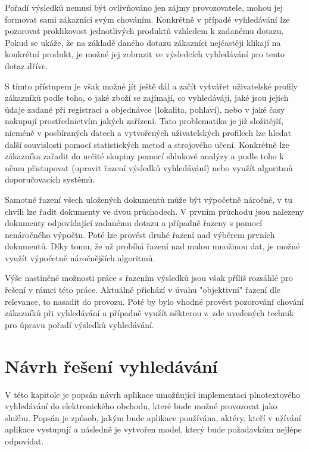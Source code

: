 \documentclass[FM,DP]{tulthesis}
\begin{document}
Pořadí výsledků nemusí být ovlivňováno jen zájmy provozovatele, mohou jej formovat
sami zákazníci svým chováním. Konkrétně v případě vyhledávání lze pozorovat proklikovost
jednotlivých produktů vzhledem k zadanému dotazu. Pokud se ukáže, že na základě
daného dotazu zákazníci nejčastěji klikají na konkrétní produkt, je možné jej zobrazit 
ve výsledcích vyhledávání pro tento dotaz dříve. 

S tímto přístupem je však možné jít ještě dál a začít vytvářet uživatelské profily zákazníků podle toho, 
o jaké zboží se zajímají, co vyhledávájí, jaké jsou jejich údaje zadané při registraci a objednávce 
(lokalita, pohlaví), nebo v jaké časy nakupují prostřednictvím jakých zařízení. Tato problematika je již
složitější, nicméně v posbíraných datech a vytvořených uživatelských profilech lze hledat další 
souvislosti pomocí statistických metod a strojového učení. Konkrétně lze zákazníka zařadit do určité 
skupiny pomocí shlukové analýzy a podle toho k němu přistupovat (upravit řazení výsledků vyhledávání) 
nebo využít algoritmů doporučovacích systémů.

Samotné řazení všech uložených dokumentů může být výpočetně náročné, v tu chvíli lze řadit
dokumenty ve dvou průchodech. V prvním průchodu jsou nalezeny dokumenty odpovídající zadanému 
dotazu a případně řazeny s pomocí nenáročného výpočtu. Poté lze provést druhé řazení nad výběrem 
prvních dokumentů. Díky tomu, že už probíhá řazení nad malou množinou dat, je možné využít 
výpočetně náročnějších algoritmů.

Výše nastíněné možnosti práce s řazením výsledků jsou však příliš rozsáhlé pro řešení v rámci
této práce. Aktuálně přichází v úvahu "objektivní" řazení dle relevance, to nasadit do provozu.
Poté by bylo vhodné provést pozorování chování zákazníků při vyhledávání a případně využít
některou z~zde uvedených technik pro úpravu pořadí výsledků vyhledávání.

\chapter{Návrh řešení vyhledávání}

V této kapitole je popsán návrh aplikace umožňující implementaci plnotextového vyhledávání
do elektronického obchodu, které bude možné provozovat jako službu. Popsán je způsob, 
jakým bude aplikace používána, aktéry, kteří v užívání aplikace vystupují a následně je vytvořen
model, který bude požadavkům nejlépe odpovídat.
\end{document}
